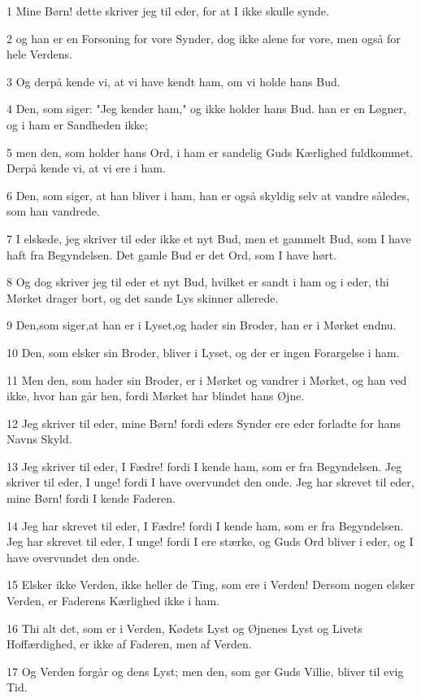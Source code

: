 \par 1 Mine Børn! dette skriver jeg til eder, for at I ikke skulle synde.
\par 2 og han er en Forsoning for vore Synder, dog ikke alene for vore, men også for hele Verdens.
\par 3 Og derpå kende vi, at vi have kendt ham, om vi holde hans Bud.
\par 4 Den, som siger: "Jeg kender ham," og ikke holder hans Bud. han er en Løgner, og i ham er Sandheden ikke;
\par 5 men den, som holder hans Ord, i ham er sandelig Guds Kærlighed fuldkommet. Derpå kende vi, at vi ere i ham.
\par 6 Den, som siger, at han bliver i ham, han er også skyldig selv at vandre således, som han vandrede.
\par 7 I elskede, jeg skriver til eder ikke et nyt Bud, men et gammelt Bud, som I have haft fra Begyndelsen. Det gamle Bud er det Ord, som I have hørt.
\par 8 Og dog skriver jeg til eder et nyt Bud, hvilket er sandt i ham og i eder, thi Mørket drager bort, og det sande Lys skinner allerede.
\par 9 Den,som siger,at han er i Lyset,og hader sin Broder, han er i Mørket endnu.
\par 10 Den, som elsker sin Broder, bliver i Lyset, og der er ingen Forargelse i ham.
\par 11 Men den, som hader sin Broder, er i Mørket og vandrer i Mørket, og han ved ikke, hvor han går hen, fordi Mørket har blindet hans Øjne.
\par 12 Jeg skriver til eder, mine Børn! fordi eders Synder ere eder forladte for hans Navns Skyld.
\par 13 Jeg skriver til eder, I Fædre! fordi I kende ham, som er fra Begyndelsen. Jeg skriver til eder, I unge! fordi I have overvundet den onde. Jeg har skrevet til eder, mine Børn! fordi I kende Faderen.
\par 14 Jeg har skrevet til eder, I Fædre! fordi I kende ham, som er fra Begyndelsen. Jeg har skrevet til eder, I unge! fordi I ere stærke, og Guds Ord bliver i eder, og I have overvundet den onde.
\par 15 Elsker ikke Verden, ikke heller de Ting, som ere i Verden! Dersom nogen elsker Verden, er Faderens Kærlighed ikke i ham.
\par 16 Thi alt det, som er i Verden, Kødets Lyst og Øjnenes Lyst og Livets Hoffærdighed, er ikke af Faderen, men af Verden.
\par 17 Og Verden forgår og dens Lyst; men den, som gør Guds Villie, bliver til evig Tid.
